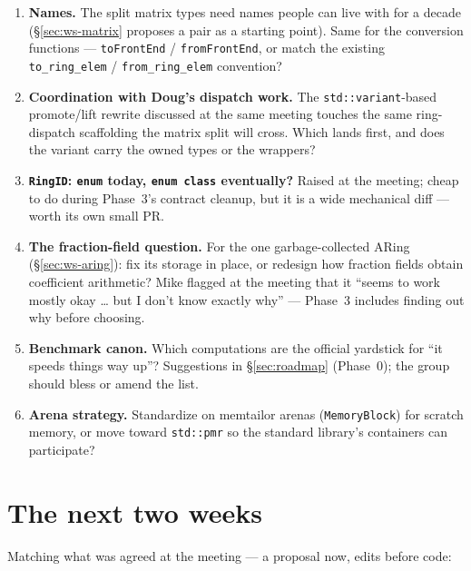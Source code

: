 \documentclass[11pt,oneside]{report}
\newcommand{\code}[1]{\textcolor{m2code}{\texttt{#1}}}
\begin{document}
\begin{enumerate}
\item \textbf{Names.} The split matrix types need names people can live
  with for a decade (\S\ref{sec:ws-matrix} proposes a pair as a starting
  point). Same for the conversion functions --- \code{toFrontEnd} /
  \code{fromFrontEnd}, or match the existing \code{to\_ring\_elem} /
  \code{from\_ring\_elem} convention?
\item \textbf{Coordination with Doug's dispatch work.} The
  \code{std::variant}-based promote/lift rewrite discussed at the same
  meeting touches the same ring-dispatch scaffolding the matrix split will
  cross. Which lands first, and does the variant carry the owned types or
  the wrappers?
\item \textbf{\code{RingID}: \code{enum} today, \code{enum class}
  eventually?} Raised at the meeting; cheap to do during Phase~3's contract
  cleanup, but it is a wide mechanical diff --- worth its own small PR.
\item \textbf{The fraction-field question.} For the one garbage-collected
  ARing (\S\ref{sec:ws-aring}): fix its storage in place, or redesign how
  fraction fields obtain coefficient arithmetic? Mike flagged at the meeting
  that it ``seems to work mostly okay \ldots{} but I don't know exactly why''
  --- Phase~3 includes finding out why before choosing.
\item \textbf{Benchmark canon.} Which computations are the official
  yardstick for ``it speeds things way up''? Suggestions in
  \S\ref{sec:roadmap} (Phase~0); the group should bless or amend the list.
\item \textbf{Arena strategy.} Standardize on memtailor arenas
  (\code{MemoryBlock}) for scratch memory, or move toward
  \code{std::pmr} so the standard library's containers can participate?
\end{enumerate}

\section{The next two weeks}
\label{sec:nexttwo}

Matching what was agreed at the meeting --- a proposal now, edits before
code:
\end{document}

